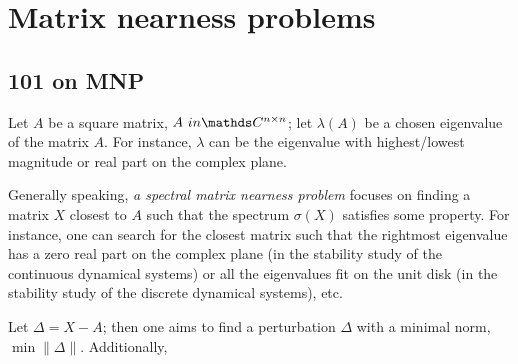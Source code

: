 \section{Matrix nearness problems}

\subsection{ 101 on MNP }

Let \( A \) be a square matrix, \( A \ in \ds C^{n \times n }\);  let \( \lambda ( A )\) be a chosen eigenvalue of the matrix \( A \). For instance, \( \lambda \) can be the eigenvalue with highest/lowest magnitude or real part on the complex plane.

Generally speaking, \emph{a spectral matrix nearness problem} focuses on finding a matrix \( X \) closest to \( A \) such that the spectrum \( \sigma ( X ) \) satisfies some property. For instance, one can search for the closest matrix such that the rightmost eigenvalue has a zero real part on the complex plane (in the stability study of the continuous dynamical systems) or all the eigenvalues fit on the unit disk (in the stability study of the discrete dynamical systems), etc.

Let \( \Delta = X - A \); then one aims to find a perturbation \( \Delta \) with a minimal norm, \( \min \| \Delta \| \). Additionally, 